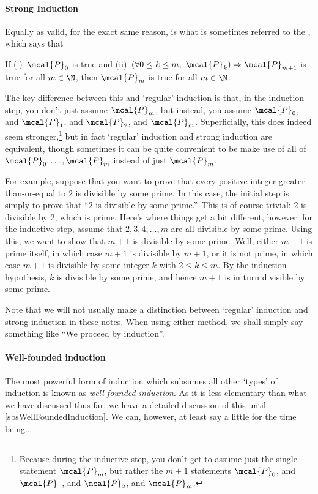 \paragraph{Strong Induction} Equally as valid, for the exact same reason, is what is sometimes referred to the , which says that
\begin{displayquote}
	If (i)~$\mcal{P}_0$ is true and (ii)~$(\forall 0\leq k\leq m,\ \mcal{P}_k)\Rightarrow \mcal{P}_{m+1}$ is true for all $m\in \N$, then $\mcal{P}_m$ is true for all $m\in \N$.
\end{displayquote}
The key difference between this and `regular' induction is that, in the induction step, you don't just assume $\mcal{P}_m$, but instead, you assume $\mcal{P}_0$, and $\mcal{P}_1$, and $\mcal{P}_2$, and \textellipsis $\mcal{P}_m$.  Superficially, this does indeed seem stronger,\footnote{Because during the inductive step, you don't get to assume just the single statement $\mcal{P}_m$, but rather the $m+1$ statements $\mcal{P}_0$, and $\mcal{P}_1$, and $\mcal{P}_2$, and \textellipsis $\mcal{P}_m$.} but in fact `regular' induction and strong induction are equivalent, though sometimes it can be quite convenient to be make use of all of $\mcal{P}_0,\ldots ,\mcal{P}_m$ instead of just $\mcal{P}_m$.

For example, suppose that you want to prove that every positive integer greater-than-or-equal to $2$ is divisible by some prime.  In this case, the initial step is simply to prove that ``$2$ is divisible by some prime.''.  This is of course trivial:  $2$ is divisible by $2$, which is prime.  Here's where things get a bit different, however:  for the inductive step, assume that $2,3,4,\ldots ,m$ are all divisible by some prime.  Using this, we want to show that $m+1$ is divisible by some prime.  Well, either $m+1$ is prime itself, in which case $m+1$ is divisible by $m+1$, or it is not prime, in which case $m+1$ is divisible by some integer $k$ with $2\leq k\leq m$.  By the induction hypothesis, $k$ is divisible by some prime, and hence $m+1$ is in turn divisible by some prime.

Note that we will not usually make a distinction between `regular' induction and strong induction in these notes.  When using either method, we shall simply say something like ``We proceed by induction\textellipsis ''.

\paragraph{Well-founded induction} The most powerful form of induction which subsumes all other `types' of induction is known as \emph{well-founded induction}.  As it is less elementary than what we have discussed thus far, we leave a detailed discussion of this until \cref{sbsWellFoundedInduction}.  We can, however, at least say a little for the time being..

